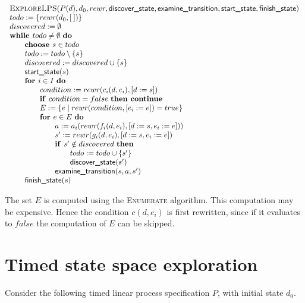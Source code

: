 \documentclass{article}
\newcommand{\Space}{\text{\ }}
\newcommand{\If}{\text{\textbf{if }}}
\newcommand{\Do}{\text{\textbf{do }}}
\newcommand{\Then}{\text{\textbf{then }}}
\newcommand{\For}{\text{\textbf{for }}}
\newcommand{\While}{\text{\textbf{while }}}
\newcommand{\Continue}{\text{\textbf{continue }}}
\newcommand{\Choose}{\text{\textbf{choose }}}
\begin{document}
\[
\begin{tabular}{l}
\textsc{ExploreLPS}($P(d), d_0, rewr, \textsf{discover\_state}, \textsf{examine\_transition},
\textsf{start\_state}, \textsf{finish\_state})$ \\
$todo := \{rewr(d_0, [\:])\}$ \\
$discovered := \emptyset$ \\
$\While todo \neq \emptyset \Space \Do$ \\
\qquad \Choose $s \in todo$ \\
\qquad $todo := todo \setminus \{s\}$ \\
\qquad $discovered := discovered \cup \{s\}$ \\
\qquad $\textsf{start\_state}(s)$ \\
\qquad $\For i \in I  \Space \Do$ \\
\qquad \qquad $condition := rewr(c_i(d, e_i), [d := s])$ \\
\qquad \qquad $\If condition = false  \Space \Then \Continue$ \\
\qquad \qquad $E := \{ e \mid rewr(condition, [e_i := e]) = true \}$ \\
\qquad \qquad $\For e \in E  \Space \Do$ \\
\qquad \qquad \qquad $a := a_i(rewr(f_i(d,e_i), [d:=s,e_i:=e]))$ \\
\qquad \qquad \qquad $s' := rewr(g_i(d,e_i), [d:=s,e_i:=e])$ \\
\qquad \qquad \qquad $\If s' \notin discovered \Space \Then$ \\
\qquad \qquad \qquad \qquad $todo := todo \cup \{ s' \}$ \\
\qquad \qquad \qquad \qquad $\textsf{discover\_state}(s')$ \\
\qquad \qquad \qquad $\textsf{examine\_transition}(s, a, s')$ \\
\qquad $\textsf{finish\_state}(s)$ \\
\end{tabular}
\]

The set $E$ is computed using the \textsc{Enumerate} algorithm. This computation may be expensive. Hence the condition $c(d,e_i)$ is first rewritten, since if it evaluates to $false$ the computation of $E$ can be skipped.

\section{Timed state space exploration}
Consider the following timed linear process specification $P$, with initial state $d_0$.
\end{document}
